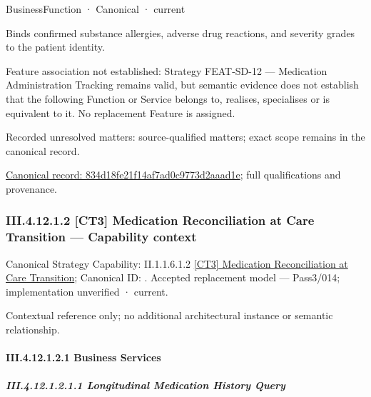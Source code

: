 \label{element:834d18fe21f14af7ad0c9773d2aaad1e}
{\small BusinessFunction · Canonical · current}\par

Binds confirmed substance allergies, adverse drug reactions, and severity grades to the patient identity.



Feature association not established: Strategy FEAT-SD-12 — Medication Administration Tracking remains valid, but semantic evidence does not establish that the following Function or Service belongs to, realises, specialises or is equivalent to it. No replacement Feature is assigned.


{\small Recorded unresolved matters: source-qualified matters; exact scope remains in the canonical record.}\par
{\footnotesize \href{../../../../../../../continuum/business/business-function/834d18fe21f14af7ad0c9773d2aaad1e.md}{Canonical record: 834d18fe21f14af7ad0c9773d2aaad1e}; full qualifications and provenance.}\par
\subsubsection*{III.4.12.1.2 [CT3] Medication Reconciliation at Care Transition — Capability context}
\label{navigation:III.4.12.1.2}

{\small Canonical Strategy Capability: II.1.1.6.1.2 \hyperref[element:f7b8e469f8834d3ebdf6451f489310e9]{[CT3] Medication Reconciliation at Care Transition}; Canonical ID: \texttt{}. Accepted replacement model — Pass3/014; implementation unverified · current.}\par
Contextual reference only; no additional architectural instance or semantic relationship.\par
\paragraph*{III.4.12.1.2.1 Business Services}
\label{navigation:III.4.12.1.2.1}

\subparagraph*{III.4.12.1.2.1.1 Longitudinal Medication History Query}
\label{navigation:III.4.12.1.2.1.1}

